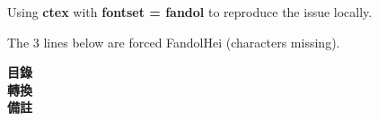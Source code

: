 \documentclass[fontset = none]{book}
\begin{document}
	Using \textbf{ctex} with \textbf{fontset = fandol} to reproduce the issue locally.\newline
	
	The 3 lines below are forced FandolHei (characters missing).\newline
	
	\textbf{目錄}\\ 
	
	\textbf{轉換}\\ 
	
	\textbf{備註}\\  
	
\end{document}
